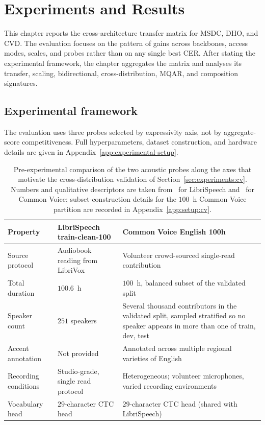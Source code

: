 \chapter{Experiments and Results}\label{ch:experiments}

This chapter reports the cross-architecture transfer matrix for
MSDC, DHO, and CVD. The evaluation focuses on the pattern of
gains across backbones, access modes, scales, and probes rather
than on any single best CER. After stating the experimental
framework, the chapter aggregates the matrix and analyses its
transfer, scaling, bidirectional, cross-distribution, MQAR, and
composition signatures.

\section{Experimental framework}\label{sec:experiments:framework}

The evaluation uses three probes selected by expressivity axis,
not by aggregate-score competitiveness. Full hyperparameters,
dataset construction, and hardware details are given in
Appendix~\ref{app:experimental-setup}.

\begin{table}[!htbp]
\centering
\small
\caption[LibriSpeech clean-100 versus Common Voice English 100h]{
Pre-experimental comparison of the two acoustic probes along the
axes that motivate the cross-distribution validation of
Section~\ref{sec:experiments:cv}. Numbers and qualitative
descriptors are taken from~\citet{panayotov2015librispeech} for
LibriSpeech and~\citet{ardila2019commonvoice} for Common Voice;
subset-construction details for the $100$~h Common Voice partition
are recorded in Appendix~\ref{app:setup:cv}.}
\label{tab:librispeech-vs-cv}
\setlength{\tabcolsep}{4pt}
\renewcommand{\arraystretch}{1.2}
\begin{tabularx}{\linewidth}{@{}p{3.2cm} X X@{}}
\toprule
\textbf{Property} & \textbf{LibriSpeech train-clean-100} & \textbf{Common Voice English 100h} \\
\midrule
Source protocol
  & Audiobook reading from LibriVox
  & Volunteer crowd-sourced single-read contribution \\
\addlinespace
Total duration
  & $100.6$~h
  & $100$~h, balanced subset of the validated split \\
\addlinespace
Speaker count
  & $251$ speakers
  & Several thousand contributors in the validated split, sampled stratified so no speaker appears in more than one of train, dev, test \\
\addlinespace
Accent annotation
  & Not provided
  & Annotated across multiple regional varieties of English \\
\addlinespace
Recording conditions
  & Studio-grade, single read protocol
  & Heterogeneous; volunteer microphones, varied recording environments \\
\addlinespace
Vocabulary head
  & $29$-character CTC head
  & $29$-character CTC head (shared with LibriSpeech) \\
\bottomrule
\end{tabularx}
\end{table}

